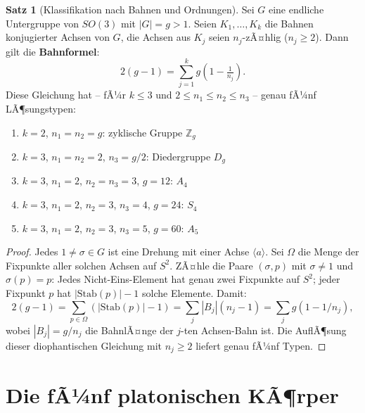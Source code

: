 ﻿\documentclass[a4paper,12pt]{report}
\theoremstyle{definition}
\newtheorem{satz}{Satz}
\begin{document}
\begin{satz}[Klassifikation nach Bahnen und Ordnungen]
    Sei $G$ eine endliche Untergruppe von $SO(3)$ mit $|G| = g > 1$.
    Seien $K_1, \dots, K_k$ die Bahnen konjugierter Achsen von $G$,
    die Achsen aus $K_j$ seien $n_j$-zÃ¤hlig ($n_j \geq 2$).
    Dann gilt die \textbf{Bahnformel}:
    \[
        2(g - 1) = \sum_{j=1}^k g\!\left(1 - \tfrac{1}{n_j}\right).
    \]
    Diese Gleichung hat -- fÃ¼r $k \leq 3$ und $2 \leq n_1 \leq n_2 \leq n_3$ --
    genau fÃ¼nf LÃ¶sungstypen:
    \begin{enumerate}
        \item[(1)] $k = 2$, $n_1 = n_2 = g$: zyklische Gruppe $\mathbb{Z}_g$
        \item[(2)] $k = 3$, $n_1 = n_2 = 2$, $n_3 = g/2$: Diedergruppe $D_g$
        \item[(3)] $k = 3$, $n_1 = 2$, $n_2 = n_3 = 3$, $g = 12$: $A_4$
        \item[(4)] $k = 3$, $n_1 = 2$, $n_2 = 3$, $n_3 = 4$, $g = 24$: $S_4$
        \item[(5)] $k = 3$, $n_1 = 2$, $n_2 = 3$, $n_3 = 5$, $g = 60$: $A_5$
    \end{enumerate}
\end{satz}
\begin{proof}
    Jedes $1 \neq \sigma \in G$ ist eine Drehung mit einer Achse $\langle a \rangle$.
    Sei $\Omega$ die Menge der Fixpunkte aller solchen Achsen auf $S^2$.
    ZÃ¤hle die Paare $(\sigma, p)$ mit $\sigma \neq 1$ und $\sigma(p) = p$:
    Jedes Nicht-Eins-Element hat genau zwei Fixpunkte auf $S^2$; jeder Fixpunkt
    $p$ hat $|\mathrm{Stab}(p)| - 1$ solche Elemente. Damit:
    \[
        2(g-1) = \sum_{p \in \Omega} (|\mathrm{Stab}(p)| - 1) = \sum_j |B_j|(n_j - 1)
        = \sum_j g(1 - 1/n_j),
    \]
    wobei $|B_j| = g/n_j$ die BahnlÃ¤nge der $j$-ten Achsen-Bahn ist.
    Die AuflÃ¶sung dieser diophantischen Gleichung mit $n_j \geq 2$ liefert
    genau fÃ¼nf Typen.
\end{proof}

\section{Die fÃ¼nf platonischen KÃ¶rper}
\end{document}
